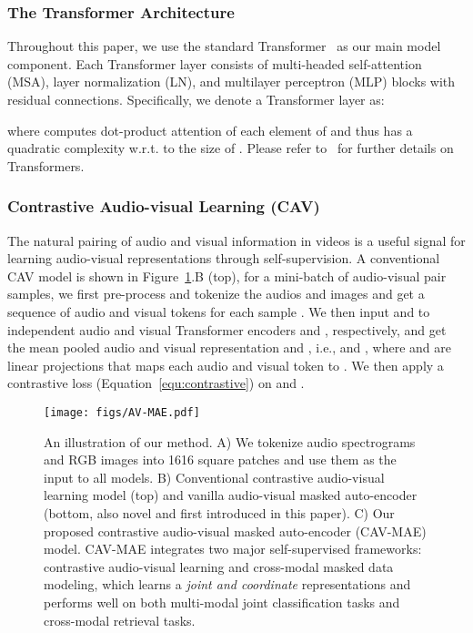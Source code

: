 \documentclass{article} \usepackage{iclr2023_conference,times}
\begin{document}
\subsubsection{The Transformer Architecture}

Throughout this paper, we use the standard Transformer~\citep{vaswani2017attention} as our main model component. Each Transformer layer consists of multi-headed self-attention (MSA), layer normalization (LN), and multilayer perceptron (MLP) blocks with residual connections. Specifically, we denote a Transformer layer  as:

where  computes dot-product attention of each element of  and thus has a quadratic complexity w.r.t. to the size of . Please refer to~\cite{vaswani2017attention} for further details on Transformers.

\subsubsection{Contrastive Audio-visual Learning (CAV)}
\label{sec:cav}
The natural pairing of audio and visual information in videos is a useful signal for learning audio-visual representations through self-supervision. A conventional CAV model is shown in Figure~\ref{fig:illus}.B (top), for a mini-batch of  audio-visual pair samples, we first pre-process and tokenize the audios and images and get a sequence of audio and visual tokens  for each sample . We then input  and  to independent audio and visual Transformer encoders  and , respectively, and get the mean pooled audio and visual representation  and , i.e.,  and , where  and  are linear projections that maps each audio and visual token to . We then apply a contrastive loss (Equation~\ref{equ:contrastive}) on  and .

\begin{figure}[t]
\centering
\texttt{[image: figs/AV-MAE.pdf]}
\caption{An illustration of our method. A) We tokenize audio spectrograms and RGB images into 1616 square patches and use them as the input to all models. B) Conventional contrastive audio-visual learning model (top) and vanilla audio-visual masked auto-encoder (bottom, also novel and first introduced in this paper). C) Our proposed contrastive audio-visual masked auto-encoder (CAV-MAE) model. CAV-MAE integrates two major self-supervised frameworks: contrastive audio-visual learning and cross-modal masked data modeling, which learns a \emph{joint and coordinate} representations and performs well on both multi-modal joint classification tasks and cross-modal retrieval tasks.}
\label{fig:illus}
\end{figure}
\end{document}
